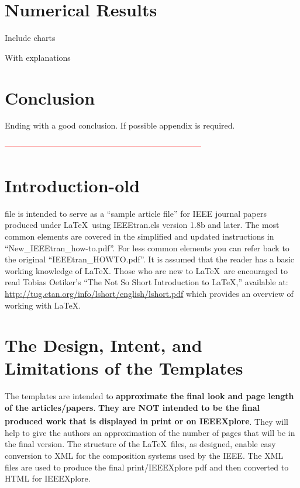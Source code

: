 \documentclass[lettersize,journal]{IEEEtran}
\begin{document}
\section{Numerical Results}

Include charts


With explanations


\section{Conclusion}

Ending with a good conclusion. If possible appendix is required.

\textcolor{red}{------------------------------------------------------------------------}

\section{Introduction-old}


 file is intended to serve as a ``sample article file''
for IEEE journal papers produced under \LaTeX\ using
IEEEtran.cls version 1.8b and later. The most common elements are covered in the simplified and updated instructions in ``New\_IEEEtran\_how-to.pdf''. For less common elements you can refer back to the original ``IEEEtran\_HOWTO.pdf''. It is assumed that the reader has a basic working knowledge of \LaTeX. Those who are new to \LaTeX \ are encouraged to read Tobias Oetiker's ``The Not So Short Introduction to \LaTeX ,'' available at: \url{http://tug.ctan.org/info/lshort/english/lshort.pdf} which provides an overview of working with \LaTeX.

\section{The Design, Intent, and \\ Limitations of the Templates}
The templates are intended to {\bf{approximate the final look and page length of the articles/papers}}. {\bf{They are NOT intended to be the final produced work that is displayed in print or on IEEEXplore\textsuperscript{\textregistered}}}. They will help to give the authors an approximation of the number of pages that will be in the final version. The structure of the \LaTeX\ files, as designed, enable easy conversion to XML for the composition systems used by the IEEE. The XML files are used to produce the final print/IEEEXplore pdf and then converted to HTML for IEEEXplore.
\end{document}
